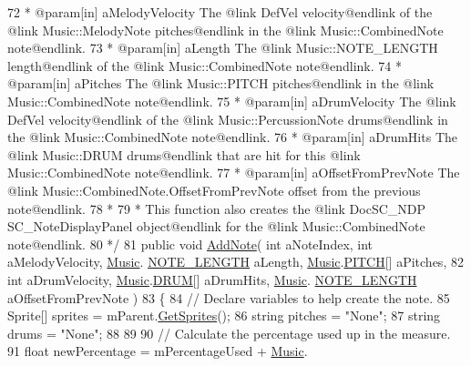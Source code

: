 \begin{DoxyCodeInclude}
72 \textcolor{comment}{     * @param[in] aMelodyVelocity The @link DefVel velocity@endlink of the @link Music::MelodyNote
       pitches@endlink in the @link Music::CombinedNote note@endlink.}
73 \textcolor{comment}{     * @param[in] aLength The @link Music::NOTE\_LENGTH length@endlink of the @link Music::CombinedNote
       note@endlink.}
74 \textcolor{comment}{     * @param[in] aPitches The @link Music::PITCH pitches@endlink in the @link Music::CombinedNote
       note@endlink.}
75 \textcolor{comment}{     * @param[in] aDrumVelocity The @link DefVel velocity@endlink of the @link Music::PercussionNote
       drums@endlink in the @link Music::CombinedNote note@endlink.}
76 \textcolor{comment}{     * @param[in] aDrumHits The @link Music::DRUM drums@endlink that are hit for this @link
       Music::CombinedNote note@endlink.}
77 \textcolor{comment}{     * @param[in] aOffsetFromPrevNote The @link Music::CombinedNote.OffsetFromPrevNote offset from the
       previous note@endlink.}
78 \textcolor{comment}{     * }
79 \textcolor{comment}{     * This function also creates the @link DocSC\_NDP SC\_NoteDisplayPanel object@endlink for the @link
       Music::CombinedNote note@endlink.}
80 \textcolor{comment}{    */}
81     \textcolor{keyword}{public} \textcolor{keywordtype}{void} \hyperlink{group___s_c___m_d_p_pub_func_gadce2fd2e70d867b38c98305e2392b3df}{AddNote}( \textcolor{keywordtype}{int} aNoteIndex, \textcolor{keywordtype}{int} aMelodyVelocity, \hyperlink{class_music}{Music}.
      \hyperlink{group___music_enums_gaf11b5f079adbb21c800b9eca1c5c3cbd}{NOTE\_LENGTH} aLength, \hyperlink{class_music}{Music}.\hyperlink{group___music_enums_ga508f69b199ea518f935486c990edac1d}{PITCH}[] aPitches,
82         \textcolor{keywordtype}{int} aDrumVelocity, \hyperlink{class_music}{Music}.\hyperlink{group___music_enums_gade475b4382c7066d1af13e7c13c029b6}{DRUM}[] aDrumHits, \hyperlink{class_music}{Music}.
      \hyperlink{group___music_enums_gaf11b5f079adbb21c800b9eca1c5c3cbd}{NOTE\_LENGTH} aOffsetFromPrevNote )
83     \{
84         \textcolor{comment}{// Declare variables to help create the note.}
85         Sprite[] sprites = mParent.\hyperlink{group___s_c___n_d_c_pub_func_ga3cdbb1068cd6511112c564fc636c56ca}{GetSprites}();
86         \textcolor{keywordtype}{string} pitches = \textcolor{stringliteral}{"None"};
87         \textcolor{keywordtype}{string} drums = \textcolor{stringliteral}{"None"};
88 
89 
90         \textcolor{comment}{// Calculate the percentage used up in the measure.}
91         \textcolor{keywordtype}{float} newPercentage = mPercentageUsed + \hyperlink{class_music}{Music}.

\end{DoxyCodeInclude}
